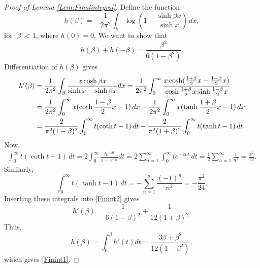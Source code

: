 \documentclass{article}
\numberwithin{equation}{section}
\numberwithin{figure}{section}
\theoremstyle{plain}
\theoremstyle{plain}
\numberwithin{thm}{section}
\theoremstyle{remark}
\newcommand{\R}{\mathbb{R}}
\begin{document}
\begin{proof}[Proof of Lemma \ref{Lem:Finalintegral}]
Define the function
\begin{equation*}
h(\beta)=-\frac 1{2\pi^2}\int_\R \log\left(1-\frac{\sinh\beta x}{\sinh x}\right)\,dx,
\end{equation*}
for $|\beta|<1$, where $h(0)=0$. We want to show that
\begin{equation}\label{Finint1}
h(\beta)+h(-\beta)=\frac{\beta^2}{6(1-\beta^2)}.
\end{equation}
Differentiation of $h(\beta)$ gives
\begin{align}\label{Finint2}
h'(\beta)&=\frac 1{2\pi^2}\int_\R\frac{x\cosh\beta x}{\sinh x-\sinh\beta x}dx=\frac 1{2\pi^2}\int_0^\infty\frac{x\cosh(\frac{1+\beta}2 x-\frac{1-\beta}2 x)}
{\cosh\frac{1+\beta}2 x\sinh\frac{1-\beta}2 x}\notag\\
&=\frac 1{2\pi^2}\int_0^\infty x(\coth\frac{1-\beta}2 x-1)\,dx-\frac 1{2\pi^2}\int_0^\infty x(\tanh\frac{1+\beta}2 x-1)\,dx\notag\\
&=\frac{2}{\pi^2(1-\beta)^2}\int_0^\infty t(\coth t-1)\,dt-\frac{2}{\pi^2(1+\beta)^2}\int_0^\infty t(\tanh t-1)\,dt.
\end{align}
Now,
\begin{align*}
\int_0^\infty t(\coth t-1)\,dt=2\int_0^\infty\frac{te^{-2t}}{1-e^{-2t}}dt=2\sum_{n=1}^\infty\int_0^\infty te^{-2nt}\,dt
=\frac 12\sum_{n=1}^\infty\frac 1{n^2}=\frac{\pi^2}{12}.
\end{align*}
Similarly,
\begin{equation*}
\int_0^\infty t(\tanh t-1)\,dt=-\sum_{n=1}^\infty\frac{(-1)^n}{n^2}=-\frac{\pi^2}{24}.
\end{equation*}
Inserting these integrals into \eqref{Finint2} gives
\begin{equation*}
h'(\beta)=\frac 1{6(1-\beta)^2}+\frac 1{12(1+\beta)^2}.
\end{equation*}
Thus,
\begin{equation*}
h(\beta)=\int_0^\beta h'(t)dt=\frac{3\beta+\beta^2}{12(1-\beta^2)},
\end{equation*}
which gives \eqref{Finint1}.
\end{proof}
\end{document}
